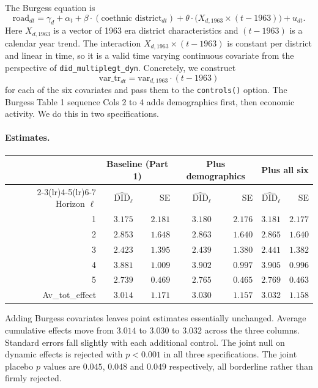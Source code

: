  The Burgess equation is
\[
\text{road}_{dt} = \gamma_d + \alpha_t + \beta \cdot (\text{coethnic district}_{dt}) + \theta \cdot \bigl(X_{d, 1963} \times (t - 1963)\bigr) + u_{dt}.
\]
Here $X_{d, 1963}$ is a vector of 1963 era district characteristics and $(t - 1963)$ is a calendar year trend. The interaction $X_{d, 1963} \times (t - 1963)$ is constant per district and linear in time, so it is a valid time varying continuous covariate from the perspective of \texttt{did\_multiplegt\_dyn}. Concretely, we construct
\[
\text{var\_tr}_{dt} = \text{var}_{d, 1963} \cdot (t - 1963)
\]
for each of the six covariates and pass them to the \texttt{controls()} option. The Burgess Table 1 sequence Cols 2 to 4 adds demographics first, then economic activity. We do this in two specifications.

\paragraph{Estimates.}
\begin{center}
\begin{tabular}{rrrrrrr}
\toprule
& \multicolumn{2}{c}{Baseline (Part 1)} & \multicolumn{2}{c}{Plus demographics} & \multicolumn{2}{c}{Plus all six} \\
\cmidrule(lr){2-3}\cmidrule(lr){4-5}\cmidrule(lr){6-7}
Horizon $\ell$ & $\widehat{\mathrm{DID}}_\ell$ & SE & $\widehat{\mathrm{DID}}_\ell$ & SE & $\widehat{\mathrm{DID}}_\ell$ & SE \\
\midrule
1 & $3.175$ & $2.181$ & $3.180$ & $2.176$ & $3.181$ & $2.177$ \\
2 & $2.853$ & $1.648$ & $2.863$ & $1.640$ & $2.865$ & $1.640$ \\
3 & $2.423$ & $1.395$ & $2.439$ & $1.380$ & $2.441$ & $1.382$ \\
4 & $3.881$ & $1.009$ & $3.902$ & $0.997$ & $3.905$ & $0.996$ \\
5 & $2.739$ & $0.469$ & $2.765$ & $0.465$ & $2.769$ & $0.463$ \\
\midrule
Av\_tot\_effect & $3.014$ & $1.171$ & $3.030$ & $1.157$ & $3.032$ & $1.158$ \\
\bottomrule
\end{tabular}
\end{center}

Adding Burgess covariates leaves point estimates essentially unchanged. Average cumulative effects move from $3.014$ to $3.030$ to $3.032$ across the three columns. Standard errors fall slightly with each additional control. The joint null on dynamic effects is rejected with $p < 0.001$ in all three specifications. The joint placebo $p$ values are $0.045$, $0.048$ and $0.049$ respectively, all borderline rather than firmly rejected.\\


